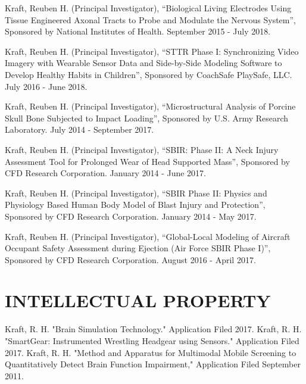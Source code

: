 \documentclass[a4paper,10pt]{article}
\begin{document}
\noindent Kraft, Reuben H. (Principal Investigator), ``Biological Living Electrodes Using Tissue Engineered Axonal Tracts to Probe and Modulate the Nervous System'', Sponsored by National Institutes of Health. September 2015 - July 2018.\vspace{0.25cm}

\noindent Kraft, Reuben H. (Principal Investigator), ``STTR Phase I: Synchronizing Video Imagery with Wearable Sensor Data and Side-by-Side Modeling Software to Develop Healthy Habits in Children'', Sponsored by CoachSafe PlaySafe, LLC. July 2016 - June 2018.\vspace{0.25cm}

\noindent Kraft, Reuben H. (Principal Investigator), ``Microstructural Analysis of Porcine Skull Bone Subjected to Impact Loading'', Sponsored by U.S. Army Research Laboratory. July 2014 - September 2017.\vspace{0.25cm}

\noindent Kraft, Reuben H. (Principal Investigator), ``SBIR: Phase II: A Neck Injury Assessment Tool for Prolonged Wear of Head Supported Mass'', Sponsored by CFD Research Corporation. January 2014 - June 2017.\vspace{0.25cm}

\noindent Kraft, Reuben H. (Principal Investigator), ``SBIR Phase II: Physics and Physiology Based Human Body Model of Blast Injury and Protection'', Sponsored by CFD Research Corporation. January 2014 - May 2017.\vspace{0.25cm}

\noindent Kraft, Reuben H. (Principal Investigator), ``Global-Local Modeling of Aircraft Occupant Safety Assessment during Ejection (Air Force SBIR Phase I)'', Sponsored by CFD Research Corporation. August 2016 - April 2017.\vspace{0.25cm}



\section*{INTELLECTUAL PROPERTY}

\noindent Kraft, R. H. "Brain Simulation Technology." Application Filed 2017.\newline
\noindent Kraft, R. H. "SmartGear: Instrumented Wrestling Headgear using Sensors." Application Filed 2017.\newline
\noindent Kraft, R. H. "Method and Apparatus for Multimodal Mobile Screening to Quantitatively Detect Brain Function Impairment," Application Filed September 2011.\newline
\end{document}
